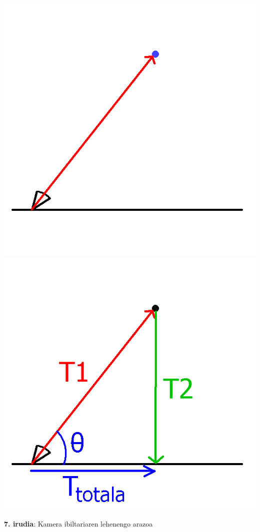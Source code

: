 \documentclass[12pt]{article}
\begin{document}
\begin{center}
\includegraphics[scale=0.3]{kam_ibil_a1.png}
\includegraphics[scale=0.3]{kam_ibil_a1_sol.png}

\textbf{7. irudia}: Kamera ibiltariaren lehenengo arazoa
\end{center}
\end{document}
